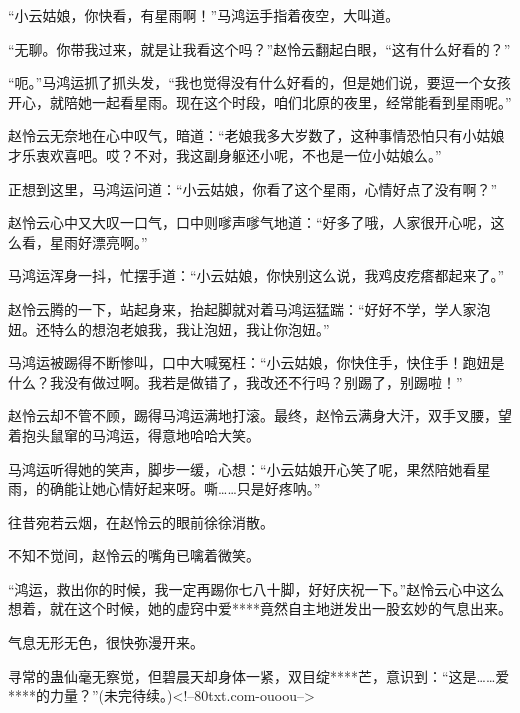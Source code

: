\begin{this_body}
“小云姑娘，你快看，有星雨啊！”马鸿运手指着夜空，大叫道。

“无聊。你带我过来，就是让我看这个吗？”赵怜云翻起白眼，“这有什么好看的？”

“呃。”马鸿运抓了抓头发，“我也觉得没有什么好看的，但是她们说，要逗一个女孩开心，就陪她一起看星雨。现在这个时段，咱们北原的夜里，经常能看到星雨呢。”

赵怜云无奈地在心中叹气，暗道：“老娘我多大岁数了，这种事情恐怕只有小姑娘才乐衷欢喜吧。哎？不对，我这副身躯还小呢，不也是一位小姑娘么。”

正想到这里，马鸿运问道：“小云姑娘，你看了这个星雨，心情好点了没有啊？”

赵怜云心中又大叹一口气，口中则嗲声嗲气地道：“好多了哦，人家很开心呢，这么看，星雨好漂亮啊。”

马鸿运浑身一抖，忙摆手道：“小云姑娘，你快别这么说，我鸡皮疙瘩都起来了。”

赵怜云腾的一下，站起身来，抬起脚就对着马鸿运猛踹：“好好不学，学人家泡妞。还特么的想泡老娘我，我让泡妞，我让你泡妞。”

马鸿运被踢得不断惨叫，口中大喊冤枉：“小云姑娘，你快住手，快住手！跑妞是什么？我没有做过啊。我若是做错了，我改还不行吗？别踢了，别踢啦！”

赵怜云却不管不顾，踢得马鸿运满地打滚。最终，赵怜云满身大汗，双手叉腰，望着抱头鼠窜的马鸿运，得意地哈哈大笑。

马鸿运听得她的笑声，脚步一缓，心想：“小云姑娘开心笑了呢，果然陪她看星雨，的确能让她心情好起来呀。嘶……只是好疼呐。”

往昔宛若云烟，在赵怜云的眼前徐徐消散。

不知不觉间，赵怜云的嘴角已噙着微笑。

“鸿运，救出你的时候，我一定再踢你七八十脚，好好庆祝一下。”赵怜云心中这么想着，就在这个时候，她的虚窍中爱****竟然自主地迸发出一股玄妙的气息出来。

气息无形无色，很快弥漫开来。

寻常的蛊仙毫无察觉，但碧晨天却身体一紧，双目绽****芒，意识到：“这是……爱****的力量？”(未完待续。)<!--80txt.com-ouoou-->

\end{this_body}


